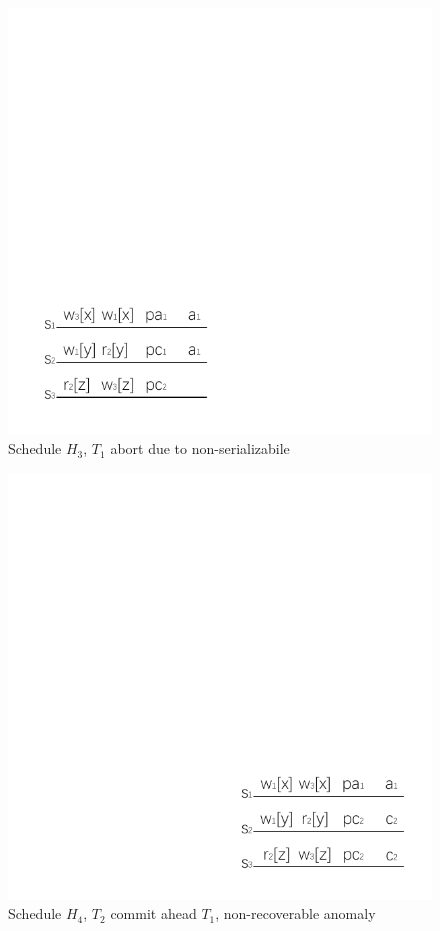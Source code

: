 \documentclass[conference]{IEEEtran}
\begin{document}
\begin{figure}[htbp]
  \centerline{\includegraphics[scale=1]{figure/schedule_not_serializabile.pdf}}
  \caption{Schedule ${H_3}$, ${T_1}$ abort due to non-serializabile}
  \label{fig:schedule_abort_example}
\end{figure}

\begin{figure}[htbp]
  \centerline{\includegraphics[scale=1]{figure/schedule_not_recoverable.pdf}}
  \caption{Schedule ${H_4}$, ${T_2}$ commit ahead ${T_1}$, non-recoverable anomaly}
  \label{fig:schedule_not_recoverable}
\end{figure}
\end{document}
